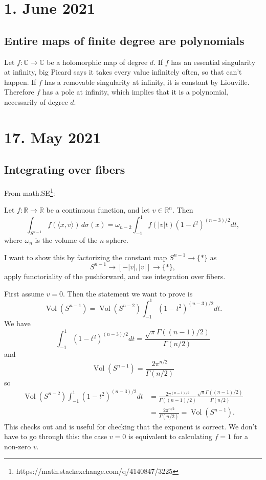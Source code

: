 \documentclass[11pt]{amsart}
\theoremstyle{definition}
\newcommand{\kk}[1]{\mathbb{#1}}
\DeclareMathOperator{\Vol}{Vol}
\begin{document}
\section*{1. June 2021}

\subsection*{Entire maps of finite degree are polynomials}

Let $f : \kk C \to \kk C$ be a holomorphic map of degree $d$. If $f$ has an essential singularity at infinity, big Picard says it takes every value infinitely often, so that can't happen. If $f$ has a removable singularity at infinity, it is constant by Liouville. Therefore $f$ has a pole at infinity, which implies that it is a polynomial, necessarily of degree $d$.




\section*{17. May 2021}
\subsection*{Integrating over fibers}

From math.SE\footnote{https://math.stackexchange.com/q/4140847/3225}:

Let $f : \kk R \to \kk R$ be a continuous function, and let $v \in \kk R^n$. Then
\[
\int_{S^{n-1}} f(\langle x, v \rangle) \, d\sigma(x)
= \omega_{n-2}\int_{-1}^1 f(|v| t) (1-t^2)^{(n-3)/2} dt,
\]
where $\omega_n$ is the volume of the $n$-sphere.


I want to show this by factorizing the constant map $S^{n-1} \to \{*\}$ as 
\[
S^{n-1} \to [-|v|, |v|] \to \{*\},
\]
apply functoriality of the pushforward, and use integration over fibers.

First assume $v = 0$. Then the statement we want to prove is
\[
\Vol(S^{n-1}) = \Vol(S^{n-2}) \int_{-1}^1 (1-t^2)^{(n-3)/2} dt.
\]
We have
\[
\int_{-1}^1 (1-t^2)^{(n-3)/2} dt
= \frac{\sqrt \pi \Gamma((n-1)/2)}{\Gamma(n/2)}
\]
and
\[
\Vol(S^{n-1}) = \frac{2 \pi^{n/2}}{\Gamma(n/2)}
\]
so
\begin{align*}
\Vol(S^{n-2})
\int_{-1}^1 (1-t^2)^{(n-3)/2} dt
&= \frac{2 \pi^{(n-1)/2}}{\Gamma((n-1)/2)}
\frac{\sqrt \pi \Gamma((n-1)/2)}{\Gamma(n/2)}
\\
&= \frac{2\pi^{n/2}}{\Gamma(n/2)}
= \Vol(S^{n-1}).
\end{align*}
This checks out and is useful for checking that the exponent is correct. We don't have to go through this: the case $v = 0$ is equivalent to calculating $f = 1$ for a non-zero $v$.
\end{document}

